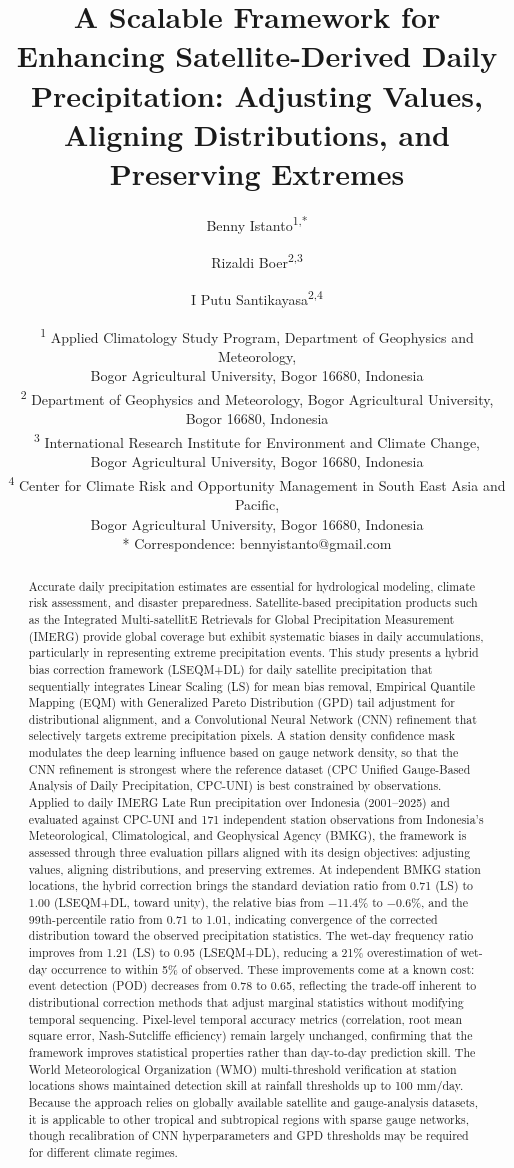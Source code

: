 \documentclass[11pt,a4paper]{article}
\title{\Large A Scalable Framework for Enhancing Satellite-Derived Daily Precipitation: Adjusting Values, Aligning Distributions, and Preserving Extremes}
\author{\normalsize
Benny Istanto\textsuperscript{1,*} \and
Rizaldi Boer\textsuperscript{2,3} \and
I Putu Santikayasa\textsuperscript{2,4}
}
\date{\small
\textsuperscript{1} Applied Climatology Study Program, Department of Geophysics and Meteorology,\\
Bogor Agricultural University, Bogor 16680, Indonesia\\[2pt]
\textsuperscript{2} Department of Geophysics and Meteorology, Bogor Agricultural University, Bogor 16680, Indonesia\\[2pt]
\textsuperscript{3} International Research Institute for Environment and Climate Change,\\
Bogor Agricultural University, Bogor 16680, Indonesia\\[2pt]
\textsuperscript{4} Center for Climate Risk and Opportunity Management in South East Asia and Pacific,\\
Bogor Agricultural University, Bogor 16680, Indonesia\\[6pt]
* Correspondence: bennyistanto@gmail.com
}
\begin{document}
\maketitle

\begin{abstract}
Accurate daily precipitation estimates are essential for hydrological modeling, climate risk assessment, and disaster preparedness. Satellite-based precipitation products such as the Integrated Multi-satellitE Retrievals for Global Precipitation Measurement (IMERG) provide global coverage but exhibit systematic biases in daily accumulations, particularly in representing extreme precipitation events. This study presents a hybrid bias correction framework (LSEQM+DL) for daily satellite precipitation that sequentially integrates Linear Scaling (LS) for mean bias removal, Empirical Quantile Mapping (EQM) with Generalized Pareto Distribution (GPD) tail adjustment for distributional alignment, and a Convolutional Neural Network (CNN) refinement that selectively targets extreme precipitation pixels. A station density confidence mask modulates the deep learning influence based on gauge network density, so that the CNN refinement is strongest where the reference dataset (CPC Unified Gauge-Based Analysis of Daily Precipitation, CPC-UNI) is best constrained by observations. Applied to daily IMERG Late Run precipitation over Indonesia (2001--2025) and evaluated against CPC-UNI and 171 independent station observations from Indonesia's Meteorological, Climatological, and Geophysical Agency (BMKG), the framework is assessed through three evaluation pillars aligned with its design objectives: adjusting values, aligning distributions, and preserving extremes. At independent BMKG station locations, the hybrid correction brings the standard deviation ratio from 0.71 (LS) to 1.00 (LSEQM+DL, toward unity), the relative bias from $-$11.4\% to $-$0.6\%, and the 99th-percentile ratio from 0.71 to 1.01, indicating convergence of the corrected distribution toward the observed precipitation statistics. The wet-day frequency ratio improves from 1.21 (LS) to 0.95 (LSEQM+DL), reducing a 21\% overestimation of wet-day occurrence to within 5\% of observed. These improvements come at a known cost: event detection (POD) decreases from 0.78 to 0.65, reflecting the trade-off inherent to distributional correction methods that adjust marginal statistics without modifying temporal sequencing. Pixel-level temporal accuracy metrics (correlation, root mean square error, Nash-Sutcliffe efficiency) remain largely unchanged, confirming that the framework improves statistical properties rather than day-to-day prediction skill. The World Meteorological Organization (WMO) multi-threshold verification at station locations shows maintained detection skill at rainfall thresholds up to 100 mm/day. Because the approach relies on globally available satellite and gauge-analysis datasets, it is applicable to other tropical and subtropical regions with sparse gauge networks, though recalibration of CNN hyperparameters and GPD thresholds may be required for different climate regimes.


\end{abstract}
\end{document}
